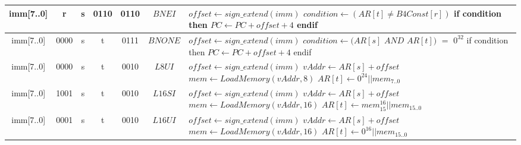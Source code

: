 \begin{smalltables}
\begin{longtable}{llllllllllllllllllllllll  p{1cm}  p{7cm} | }
       \multicolumn{8}{|c|}{imm[7..0]} & \multicolumn{4}{c|}{r} & \multicolumn{4}{c|}{s} & \multicolumn{4}{c|}{0110} & \multicolumn{4}{c|}{0110} & \multicolumn{1}{c|}{$BNEI$} & $offset \leftarrow sign\_extend(imm)$ \newline $condition \leftarrow (AR[t] \neq B4Const[r])$ \newline if condition then \newline $PC \leftarrow PC + offset + 4$ \newline endif\\ \hline
       \multicolumn{8}{|c|}{imm[7..0]} & \multicolumn{4}{c|}{0000} & \multicolumn{4}{c|}{s} & \multicolumn{4}{c|}{t} & \multicolumn{4}{c|}{0111} & \multicolumn{1}{c|}{$BNONE$} & $offset \leftarrow sign\_extend(imm)$ \newline $condition \leftarrow (AR[s]$ $AND$ $AR[t])$ $=$ $0^{32}$ \newline if condition then \newline $PC \leftarrow PC + offset + 4$ \newline endif\\ \hline
	   \multicolumn{8}{|c|}{imm[7..0]} & \multicolumn{4}{c|}{0000} & \multicolumn{4}{c|}{s} & \multicolumn{4}{c|}{t} & \multicolumn{4}{c|}{0010} & \multicolumn{1}{c|}{$L8UI$} & $offset \leftarrow sign\_extend(imm)$ \newline $vAddr \leftarrow AR[s] + offset$ \newline $mem \leftarrow LoadMemory(vAddr, 8)$ \newline $AR[t] \leftarrow 0^{24}||mem_{7..0}$\\ \hline
	   \multicolumn{8}{|c|}{imm[7..0]} & \multicolumn{4}{c|}{1001} & \multicolumn{4}{c|}{s} & \multicolumn{4}{c|}{t} & \multicolumn{4}{c|}{0010} & \multicolumn{1}{c|}{$L16SI$} & $offset \leftarrow sign\_extend(imm)$ \newline $vAddr \leftarrow AR[s] + offset$ \newline $mem \leftarrow LoadMemory(vAddr, 16)$ \newline $AR[t] \leftarrow mem_{15}^{16}||mem_{15..0}$\\ \hline
	   \multicolumn{8}{|c|}{imm[7..0]} & \multicolumn{4}{c|}{0001} & \multicolumn{4}{c|}{s} & \multicolumn{4}{c|}{t} & \multicolumn{4}{c|}{0010} & \multicolumn{1}{c|}{$L16UI$} & $offset \leftarrow sign\_extend(imm)$ \newline $vAddr \leftarrow AR[s] + offset$ \newline $mem \leftarrow LoadMemory(vAddr, 16)$ \newline $AR[t] \leftarrow 0^{16}||mem_{15..0}$\\ \hline

\end{longtable}
\end{smalltables}
